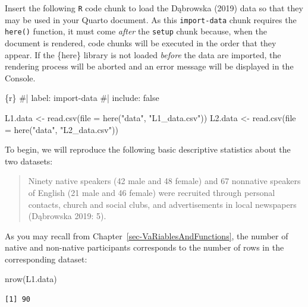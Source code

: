 \documentclass[
  letterpaper,
  DIV=11,
  numbers=noendperiod]{scrreprt}
\newenvironment{Shaded}{\begin{snugshade}}{\end{snugshade}}
\newcommand{\AttributeTok}[1]{\textcolor[rgb]{0.40,0.45,0.13}{#1}}
\newcommand{\CommentTok}[1]{\textcolor[rgb]{0.37,0.37,0.37}{#1}}
\newcommand{\FunctionTok}[1]{\textcolor[rgb]{0.28,0.35,0.67}{#1}}
\newcommand{\InformationTok}[1]{\textcolor[rgb]{0.37,0.37,0.37}{#1}}
\newcommand{\NormalTok}[1]{\textcolor[rgb]{0.00,0.23,0.31}{#1}}
\newcommand{\OtherTok}[1]{\textcolor[rgb]{0.00,0.23,0.31}{#1}}
\newcommand{\StringTok}[1]{\textcolor[rgb]{0.13,0.47,0.30}{#1}}
\begin{document}
Insert the following \texttt{R} code chunk to load the Dąbrowska (2019)
data so that they may be used in your Quarto document. As this
\texttt{import-data} chunk requires the \texttt{here()} function, it
must come \emph{after} the \texttt{setup} chunk because, when the
document is rendered, code chunks will be executed in the order that
they appear. If the \{here\} library is not loaded \emph{before} the
data are imported, the rendering process will be aborted and an error
message will be displayed in the Console.

\begin{Shaded}
\begin{Highlighting}[]
\InformationTok{\textasciigrave{}\textasciigrave{}\textasciigrave{}\{r\}}
\CommentTok{\#| label: import{-}data}
\CommentTok{\#| include: false}
  
\NormalTok{L1.data }\OtherTok{\textless{}{-}} \FunctionTok{read.csv}\NormalTok{(}\AttributeTok{file =} \FunctionTok{here}\NormalTok{(}\StringTok{"data"}\NormalTok{, }\StringTok{"L1\_data.csv"}\NormalTok{))}
\NormalTok{L2.data }\OtherTok{\textless{}{-}} \FunctionTok{read.csv}\NormalTok{(}\AttributeTok{file =} \FunctionTok{here}\NormalTok{(}\StringTok{"data"}\NormalTok{, }\StringTok{"L2\_data.csv"}\NormalTok{))}
\InformationTok{\textasciigrave{}\textasciigrave{}\textasciigrave{}}
\end{Highlighting}
\end{Shaded}

To begin, we will reproduce the following basic descriptive statistics
about the two datasets:

\begin{quote}
Ninety native speakers (42 male and 48 female) and 67 nonnative speakers
of English (21 male and 46 female) were recruited through personal
contacts, church and social clubs, and advertisements in local
newspapers (Dąbrowska 2019: 5).
\end{quote}

As you may recall from Chapter~\ref{sec-VaRiablesAndFunctions}, the
number of native and non-native participants corresponds to the number
of rows in the corresponding dataset:

\begin{Shaded}
\begin{Highlighting}[]
\FunctionTok{nrow}\NormalTok{(L1.data)}
\end{Highlighting}
\end{Shaded}

\begin{verbatim}
[1] 90
\end{verbatim}
\end{document}
